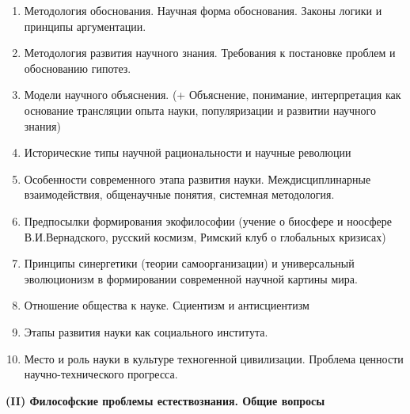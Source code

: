 \documentclass[main.tex]{subfiles}
\begin{document}
\begin{enumerate}[nosep,leftmargin=*]
	\item Методология обоснования. Научная форма обоснования. Законы логики и принципы аргументации.
	\item Методология развития научного знания. Требования к постановке проблем и обоснованию гипотез.
	\item Модели научного объяснения. (+ Объяснение, понимание, интерпретация как основание трансляции опыта науки, популяризации и развитии научного знания)
	\item Исторические типы научной рациональности и научные революции
	\item Особенности современного этапа развития науки. Междисциплинарные взаимодействия, общенаучные понятия, системная методология.
	\item Предпосылки формирования экофилософии (учение о биосфере и ноосфере В.И.Вернадского, русский космизм, Римский клуб о глобальных кризисах)
	\item Принципы синергетики (теории самоорганизации) и универсальный эволюционизм в формировании современной научной картины мира.
	\item Отношение общества к науке. Сциентизм и антисциентизм
	\item Этапы развития науки как социального института.
	\item Место и роль науки в культуре техногенной цивилизации. Проблема ценности научно-технического прогресса.
\end{enumerate}

\vspace{12mm}
{\parindent0pt\textbf{(II) Философские проблемы естествознания. Общие вопросы}}
\end{document}
